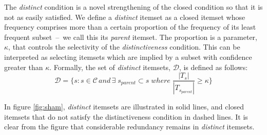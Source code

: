 \documentclass{sig-alternate}
\begin{document}
The \emph{distinct} condition is a novel strengthening of the closed condition
so that it is not as easily satisfied. %
We define a \emph{distinct} itemset as a closed itemset whose frequency
comprises more than a certain proportion of the frequency of its least
frequent subset~--~we call this its \emph{parent} itemset. 
The proportion is a parameter, $\kappa$, that controls the selectivity of the
\emph{distinctiveness} condition.
This can be interpreted as selecting itemsets which are implied by a subset
with confidence greater than $\kappa$.
Formally, the set of \emph{distinct} itemsets, $\mathcal{D}$,
is defined as follows:
\begin{equation}\mathcal{D} = \{s: s \in \mathcal{C} \, and \, \exists \; s_{parent} \subset s \; where \; \frac{|T_{s}|}{|T_{s_{parent}}|} \ge \kappa 
\}
\end{equation}


In figure \ref{fig:sham}, \emph{distinct} itemsets are illustrated in solid
lines, and closed itemsets that do not satisfy the distinctiveness condition in dashed lines.
It is clear from the figure that considerable redundancy remains in
\emph{distinct} itemsets.
\end{document}
